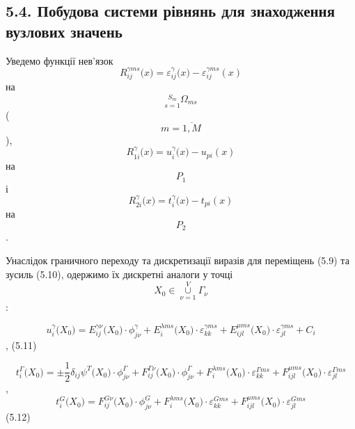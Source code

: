 \hypertarget{ux43fux43eux431ux443ux434ux43eux432ux430-ux441ux438ux441ux442ux435ux43cux438-ux440ux456ux432ux43dux44fux43dux44c-ux434ux43bux44f-ux437ux43dux430ux445ux43eux434ux436ux435ux43dux43dux44f-ux432ux443ux437ux43bux43eux432ux438ux445-ux437ux43dux430ux447ux435ux43dux44c-2}{%
\subsection[5.4. Побудова системи рівнянь для знаходження вузлових
значень]{\texorpdfstring{\protect\hypertarget{anchor-64}{}{}5.4.
Побудова системи рівнянь для знаходження вузлових
значень}{5.4. Побудова системи рівнянь для знаходження вузлових значень}}\label{ux43fux43eux431ux443ux434ux43eux432ux430-ux441ux438ux441ux442ux435ux43cux438-ux440ux456ux432ux43dux44fux43dux44c-ux434ux43bux44f-ux437ux43dux430ux445ux43eux434ux436ux435ux43dux43dux44f-ux432ux443ux437ux43bux43eux432ux438ux445-ux437ux43dux430ux447ux435ux43dux44c-2}}

Уведемо функції нев'язок
\[{R_{\mathit{\text{ij}}}^{\gamma\mathit{\text{ms}}}(x{) = \varepsilon_{\mathit{\text{ij}}}^{\gamma}}(x{) - \varepsilon_{\mathit{\text{ij}}}^{\gamma\mathit{\text{ms}}}}(x)}{}\]
на
\[{\underset{s = 1}{\overset{S_{m}}{}}\Omega_{\mathit{\text{ms}}}}{}\]
(\[{m = \overline{1,M}}{}\]),
\[{R_{1i}^{\gamma}(x{) = u_{i}^{\gamma}}(x{) - u_{\mathit{\text{pi}}}}(x)}{}\]
на \[P_{1}{}\] і
\[{R_{2i}^{\gamma}(x{) = t_{i}^{\gamma}}(x{) - t_{\mathit{\text{pi}}}}(x)}{}\]
на \[P_{2}{}\].

Унаслідок граничного переходу та дискретизації виразів для переміщень
(5.9) та зусиль (5.10), одержимо їх дискретні аналоги у точці
\[{X_{0}{\in\underset{\nu = 1}{\overset{V}{\cup}}\Gamma_{\nu}}}{}\]:

\[{u_{i}^{\gamma}(X_{0}{) = E_{\mathit{\text{ij}}}^{\mathit{\text{γν}}}}(X_{0}{{) \cdot \phi_{\mathit{j\nu}}^{\gamma}} + E_{i}^{\lambda\mathit{\text{ms}}}}(X_{0}{{) \cdot \varepsilon_{\mathit{\text{kk}}}^{\gamma\mathit{\text{ms}}}} + E_{\mathit{\text{ijl}}}^{\mu\mathit{\text{ms}}}}(X_{0}{{) \cdot \varepsilon_{\mathit{\text{jl}}}^{\gamma\mathit{\text{ms}}}} + C_{i}}}{}\],
(5.11)

\[{t_{i}^{\Gamma}(X_{0}{) = {\pm \frac{1}{2}}}\delta_{\mathit{\text{ij}}}\psi^{T}(X_{0}{{) \cdot \phi_{\mathit{j\nu}}^{\Gamma}} + F_{\mathit{\text{ij}}}^{\mathit{\Gamma\nu}}}(X_{0}{{) \cdot \phi_{\mathit{j\nu}}^{\Gamma}} + F_{i}^{\lambda\mathit{\text{ms}}}}(X_{0}{{) \cdot \varepsilon_{\mathit{\text{kk}}}^{\Gamma\mathit{\text{ms}}}} + F_{\mathit{\text{ijl}}}^{\mu\mathit{\text{ms}}}}(X_{0}{) \cdot \varepsilon_{\mathit{\text{jl}}}^{\Gamma\mathit{\text{ms}}}}}{}\],\[{t_{i}^{G}(X_{0}{) = F_{\mathit{\text{ij}}}^{\mathit{G\nu}}}(X_{0}{{) \cdot \phi_{\mathit{j\nu}}^{G}} + F_{i}^{\lambda\mathit{\text{ms}}}}(X_{0}{{) \cdot \varepsilon_{\mathit{\text{kk}}}^{\mathit{\text{Gms}}}} + F_{\mathit{\text{ijl}}}^{\mu\mathit{\text{ms}}}}(X_{0}{) \cdot \varepsilon_{\mathit{\text{jl}}}^{\mathit{\text{Gms}}}}}{}\](5.12)

